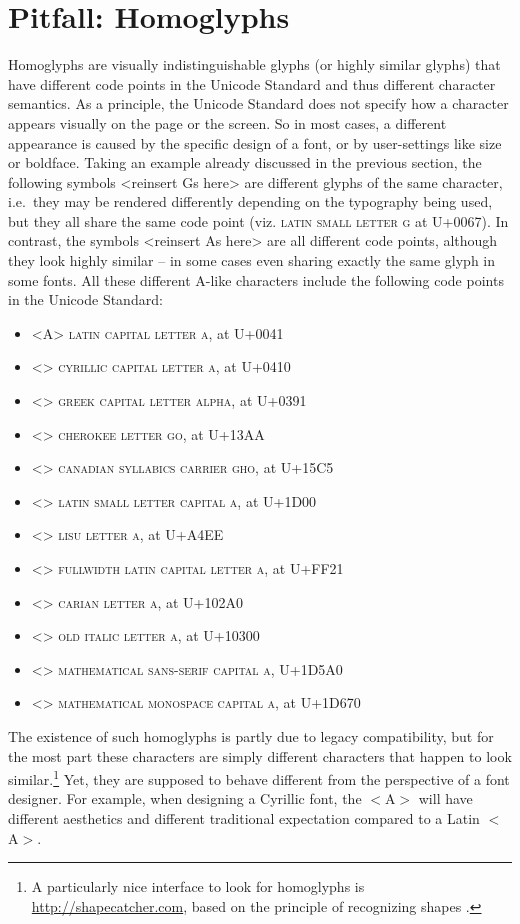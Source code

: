 \section{Pitfall: Homoglyphs} \label{pitfall-homoglyphs}

Homoglyphs are visually indistinguishable glyphs (or highly similar glyphs) that
have different code points in the Unicode Standard and thus different character
semantics. As a principle, the Unicode Standard does not specify how a character
appears visually on the page or the screen. So in most cases, a different
appearance is caused by the specific design of a font, or by user-settings like
size or boldface. Taking an example already discussed in the previous section,
the following symbols <reinsert Gs here> are different glyphs of the same
character, i.e.~they may be rendered differently depending on the typography
being used, but they all share the same code point (viz. \textsc{latin small
letter g} at U+0067). In contrast, the symbols <reinsert As here> are all
different code points, although they look highly similar -- in some cases even
sharing exactly the same glyph in some fonts. All these different A-like
characters include the following code points in the Unicode Standard:

\begin{itemize}
	\item <A> \textsc{latin capital letter a}, at U+0041 \item <>
	\textsc{cyrillic capital letter a}, at U+0410 \item <> \textsc{greek
	capital letter alpha}, at U+0391 \item <> \textsc{cherokee letter go},
	at U+13AA \item <> \textsc{canadian syllabics carrier gho}, at U+15C5
	\item <> \textsc{latin small letter capital a}, at U+1D00 \item <>
	\textsc{lisu letter a}, at U+A4EE \item <> \textsc{fullwidth latin
	capital letter a}, at U+FF21 \item <> \textsc{carian letter a}, at
	U+102A0 \item <> \textsc{old italic letter a}, at U+10300 \item <>
	\textsc{mathematical sans-serif capital a}, U+1D5A0 \item <>
	\textsc{mathematical monospace capital a}, at U+1D670
\end{itemize}

The existence of such homoglyphs is partly due to legacy compatibility, but for
the most part these characters are simply different characters that happen to
look similar.\footnote{A particularly nice interface to look for homoglyphs is
\url{http://shapecatcher.com}, based on the principle of recognizing shapes
\citep{Belongie_etal2002}.} Yet, they are supposed to behave different from the
perspective of a font designer. For example, when designing a Cyrillic font, the
$<$A$>$ will have different aesthetics and different traditional expectation
compared to a Latin $<$A$>$.

